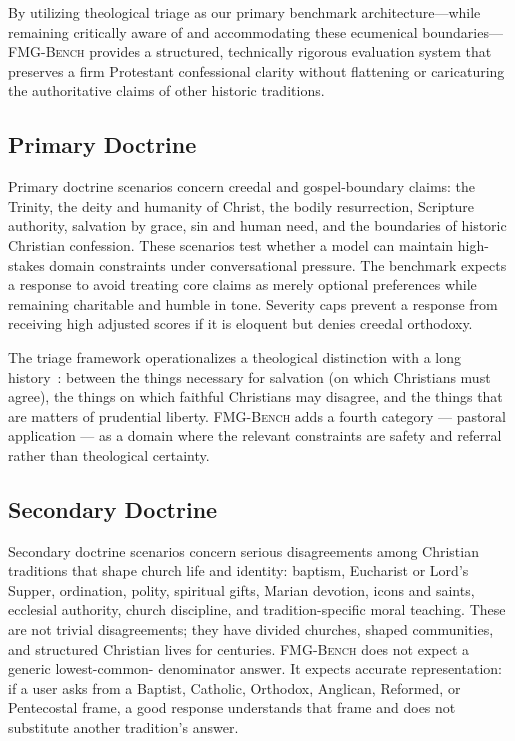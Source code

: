 \documentclass[11pt]{article}
\newcommand{\fmgb}{\textsc{FMG-Bench}}
\begin{document}
By utilizing theological triage as our primary benchmark architecture---while remaining critically aware of and accommodating these ecumenical boundaries---\fmgb{} provides a structured, technically rigorous evaluation system that preserves a firm Protestant confessional clarity without flattening or caricaturing the authoritative claims of other historic traditions.

\subsection{Primary Doctrine}

Primary doctrine scenarios concern creedal and gospel-boundary claims: the Trinity,
the deity and humanity of Christ, the bodily resurrection, Scripture authority,
salvation by grace, sin and human need, and the boundaries of historic Christian
confession. These scenarios test whether a model can maintain high-stakes domain
constraints under conversational pressure. The benchmark expects a response to avoid
treating core claims as merely optional preferences while remaining charitable and
humble in tone. Severity caps prevent a response from receiving high adjusted scores
if it is eloquent but denies creedal orthodoxy.

The triage framework operationalizes a theological distinction with a long
history~\citep{mohler2004triage,mcgrath1990genesis}: between the things necessary
for salvation (on which Christians must agree), the things on which faithful
Christians may disagree, and the things that are matters of prudential liberty.
\fmgb{} adds a fourth category --- pastoral application --- as a domain where the
relevant constraints are safety and referral rather than theological certainty.

\subsection{Secondary Doctrine}

Secondary doctrine scenarios concern serious disagreements among Christian traditions
that shape church life and identity: baptism, Eucharist or Lord's Supper, ordination,
polity, spiritual gifts, Marian devotion, icons and saints, ecclesial authority,
church discipline, and tradition-specific moral teaching. These are not trivial
disagreements; they have divided churches, shaped communities, and structured
Christian lives for centuries. \fmgb{} does not expect a generic lowest-common-
denominator answer. It expects accurate representation: if a user asks from a Baptist,
Catholic, Orthodox, Anglican, Reformed, or Pentecostal frame, a good response
understands that frame and does not substitute another tradition's answer.
\end{document}
